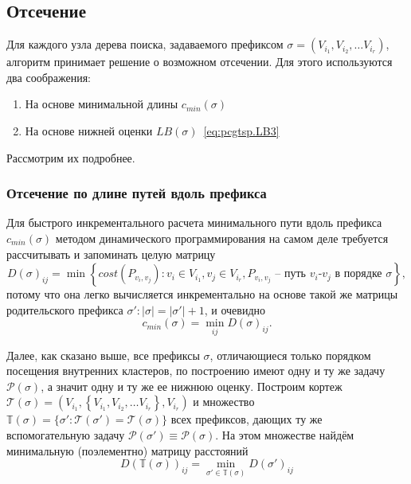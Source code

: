 
\subsection{Отсечение}
\label{sec:pgstcp.cut}

Для каждого узла дерева поиска,
задаваемого префиксом
$\sigma=(V_{i_1}, V_{i_2}, \dots V_{i_r})$,
алгоритм принимает решение
о возможном отсечении.
Для этого используются два соображения:

\begin{enumerate}
  \item На основе минимальной длины $c_{min}(\sigma)$
  \item На основе нижней оценки $LB(\sigma)$~\eqref{eq:pcgtsp.LB3}
\end{enumerate}

Рассмотрим их подробнее.

\subsubsection{Отсечение по длине путей вдоль префикса}

Для быстрого инкрементального расчета
минимального пути вдоль префикса
$c_{min}(\sigma)$
методом динамического программирования
на самом деле требуется рассчитывать
и запоминать целую матрицу
$$
D(\sigma)_{ij} = \min\left\{
  cost(P_{v_i,v_j})\colon
  v_i \in V_{i_1},
  v_j \in V_{i_r},
  P_{v_i,v_j} \text{ -- путь $v_i$-$v_j$ в порядке } \sigma
\right\}
,
$$
потому что она легко вычисляется
инкрементально на основе такой же матрицы
родительского префикса $\sigma': |\sigma| = |\sigma'|+1$,
и очевидно
\begin{equation}
  \label{eq.pcgtsp.c_min.dp}
  c_{min}(\sigma) = \min_{ij} D(\sigma)_{ij}
  .
\end{equation}

Далее, как сказано выше,
все префиксы $\sigma$,
отличающиеся только порядком
посещения внутренних кластеров,
по построению имеют одну и ту же задачу
$\mathcal P(\sigma)$,
а значит одну и ту же ее нижнюю оценку.
Построим кортеж
$\mathcal T(\sigma) = (V_{i_1},
\left\{V_{i_1}, V_{i_2}, \dots V_{i_r} \right\}, V_{i_r})$
и множество
$
\mathbb T(\sigma) =\{\sigma' \colon \mathcal T(\sigma')=\mathcal T(\sigma)\}$
всех префиксов,
дающих ту же вспомогательную задачу
$\mathcal P(\sigma')\equiv \mathcal P(\sigma)$.
На этом множестве найдём минимальную
(поэлементно)
матрицу расстояний
$$
D(\mathbb T(\sigma))_{ij} =
  \min_{\sigma' \in \mathbb T(\sigma)} D(\sigma')_{ij}
$$

